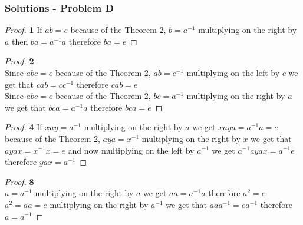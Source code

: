 \documentclass[11pt]{article}
\begin{document}
	\subsubsection*{Solutions - Problem D}
		\begin{proof}{\textbf{1}}
			If $ab=e$ because of the Theorem 2, $b=a^{-1}$ multiplying on the right by $a$ then $ba=a^{-1}a$ therefore $ba=e$
		\end{proof}
		\begin{proof}{\textbf{2}}\\
			Since $abc=e$ because of the Theorem 2, $ab=c^{-1}$ multiplying on the left by $c$ we get that $cab=cc^{-1}$ therefore $cab=e$\\
			Since $abc=e$ because of the Theorem 2, $bc=a^{-1}$ multiplying on the right by $a$ we get that $bca=a^{-1}a$ therefore $bca=e$
		\end{proof}
		\begin{proof}{\textbf{4}}
			If $xay=a^{-1}$ multiplying on the right by $a$ we get $xaya=a^{-1}a=e$ because of the Theorem 2, $aya=x^{-1}$ multiplying on the right by $x$ we get that $ayax=x^{-1}x=e$ and now multiplying on the left by $a^{-1}$ we get $a^{-1}ayax=a^{-1}e$ therefore $yax=a^{-1}$
		\end{proof}
		\begin{proof}{\textbf{8}}\\
			$a=a^{-1}$ multiplying on the right by $a$ we get $aa=a^{-1}a$ therefore $a^2=e$\\
			$a^2=aa=e$ multiplying on the right by $a^{-1}$ we get that $aaa^{-1}=ea^{-1}$ therefore $a=a^{-1}$
		\end{proof}
\end{document}
